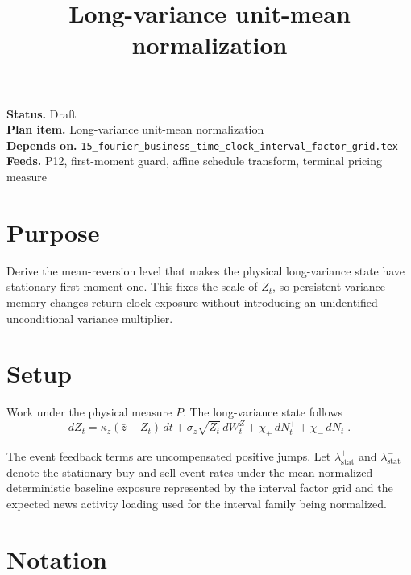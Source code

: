 \documentclass[11pt]{article}
\title{Long-variance unit-mean normalization}
\author{}
\date{}
\begin{document}
\maketitle

\noindent\textbf{Status.} Draft\\
\textbf{Plan item.} Long-variance unit-mean normalization\\
\textbf{Depends on.} \texttt{15\_fourier\_business\_time\_clock\_interval\_factor\_grid.tex}\\
\textbf{Feeds.} P12, first-moment guard, affine schedule transform, terminal pricing measure

\section{Purpose}

Derive the mean-reversion level that makes the physical long-variance state
have stationary first moment one.
This fixes the scale of \(Z_t\), so persistent
variance memory changes return-clock exposure without introducing an
unidentified unconditional variance multiplier.

\section{Setup}

Work under the physical measure \(P\).
The long-variance state follows
\[
    dZ_t
    =
    \kappa_z(\bar z-Z_t)\,dt
    +\sigma_z\sqrt{Z_t}\,dW_t^Z
    +\chi_+\,dN_t^+
    +\chi_-\,dN_t^-.
\]

The event feedback terms are uncompensated positive jumps. Let
\(\lambda_{\mathrm{stat}}^+\) and \(\lambda_{\mathrm{stat}}^-\) denote the
stationary buy and sell event rates under the mean-normalized deterministic
baseline exposure represented by the interval factor grid and the expected news
activity loading used for the interval family being normalized.

\section{Notation}
\end{document}
